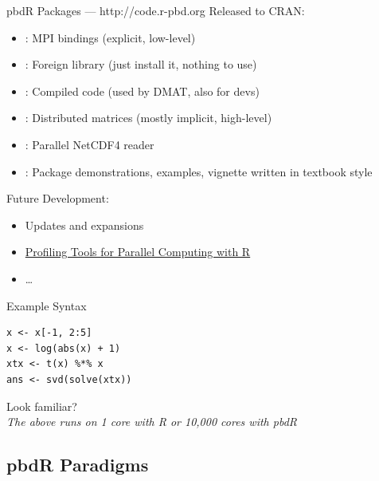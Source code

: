 \begin{frame}[shrink]
  \begin{block}{pbdR Packages --- http://code.r-pbd.org}\pause
  Released to CRAN:
  \begin{itemize}[<+-|alert@+>]
    \item {}: MPI bindings (explicit, low-level)
    \item {}: Foreign library (just install it, nothing to use)
    \item {}: Compiled code (used by DMAT, also for devs)
    \item {}: Distributed matrices (mostly implicit, high-level)
    \item {}: Parallel NetCDF4 reader
    \item {}: Package demonstrations, examples, vignette written in textbook style
  \end{itemize}
    Future Development:
  \begin{itemize}[<+-|alert@+>]
    \item Updates and expansions
    \item \href{http://rwiki.sciviews.org/doku.php?id=developers:projects:gsoc2013:mpiprofiler}{Profiling Tools for Parallel Computing with R}
    \item \dots
  \end{itemize}
  \end{block}
\end{frame}



\begin{frame}[fragile]
  \begin{block}{Example Syntax}\pause
  \begin{lstlisting}
x <- x[-1, 2:5]
x <- log(abs(x) + 1)
xtx <- t(x) %*% x
ans <- svd(solve(xtx))
  \end{lstlisting}
  \begin{center}
  \pause Look familiar?\\[.4cm] \pause
  \emph{The above runs on 1 core with R or 10,000 cores with pbdR}
  \end{center}
  \end{block}
\end{frame}



\subsection{pbdR Paradigms}

